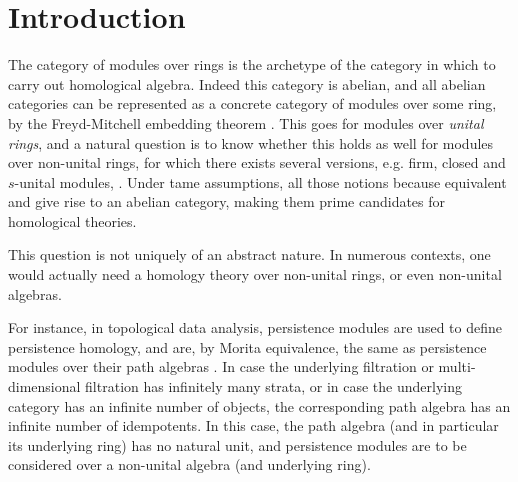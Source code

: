 \documentclass[a4paper,fleqn]{cas-sc}
\newcommand{\bA}{\mathbb{A}}
\begin{document}

\maketitle




\section{Introduction}

The category of modules over rings is the archetype of the category in which to carry out homological algebra. Indeed this category is abelian, and all abelian categories can be represented as a concrete category of modules over some ring, by the Freyd-Mitchell embedding theorem \cite{freyd1964abelian}. This goes for modules over {\em unital rings}, and a natural question is to know whether this holds as well for modules over non-unital rings, for which there exists several versions, e.g. firm, closed and $s$-unital modules, \cite{quillen,thfmn,tominaga}. %
Under tame assumptions, all those notions because equivalent and give rise to an abelian category, making them prime candidates for homological theories. %


This question is not uniquely of an abstract nature. In numerous contexts, one would actually need a homology theory over non-unital rings, or even non-unital algebras. 

For instance, in topological data analysis, persistence modules \cite{Carlsson,multidimpersistence,Bubenik} are used to define persistence homology, and are, by Morita equivalence, the same as persistence modules over their path algebras \cite{assocalg}. In case the underlying filtration or  multi-dimensional filtration has infinitely many strata, or in case the underlying category has an infinite number of objects, the corresponding path algebra has an infinite number of idempotents. In this case, the path algebra (and in particular its underlying ring) has no natural unit, and persistence modules are to be considered over a non-unital algebra (and underlying ring). 
\end{document}
